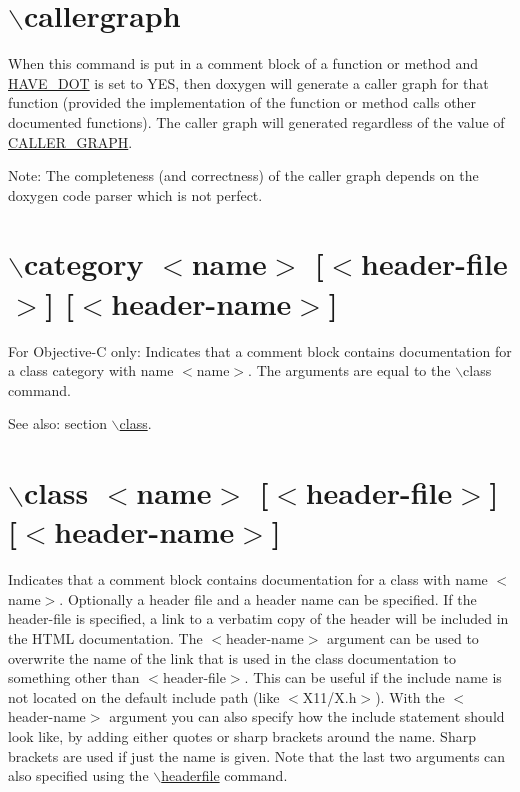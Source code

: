  \hypertarget{commands_cmdcallergraph}{}\section{$\backslash$callergraph}\label{commands_cmdcallergraph}
 When this command is put in a comment block of a function or method and \hyperlink{config_cfg_have_dot}{HAVE\_\-DOT} is set to YES, then doxygen will generate a caller graph for that function (provided the implementation of the function or method calls other documented functions). The caller graph will generated regardless of the value of \hyperlink{config_cfg_caller_graph}{CALLER\_\-GRAPH}. \begin{Desc}
\item[Note:]The completeness (and correctness) of the caller graph depends on the doxygen code parser which is not perfect.\end{Desc}


 \hypertarget{commands_cmdcategory}{}\section{$\backslash$category $<$name$>$ \mbox{[}$<$header-file$>$\mbox{]} \mbox{[}$<$header-name$>$\mbox{]}}\label{commands_cmdcategory}
 For Objective-C only: Indicates that a comment block contains documentation for a class category with name $<$name$>$. The arguments are equal to the $\backslash$class command.

\begin{Desc}
\item[See also:]section \hyperlink{commands_cmdclass}{$\backslash$class}.\end{Desc}


 \hypertarget{commands_cmdclass}{}\section{$\backslash$class $<$name$>$ \mbox{[}$<$header-file$>$\mbox{]} \mbox{[}$<$header-name$>$\mbox{]}}\label{commands_cmdclass}
 Indicates that a comment block contains documentation for a class with name $<$name$>$. Optionally a header file and a header name can be specified. If the header-file is specified, a link to a verbatim copy of the header will be included in the HTML documentation. The $<$header-name$>$ argument can be used to overwrite the name of the link that is used in the class documentation to something other than $<$header-file$>$. This can be useful if the include name is not located on the default include path (like $<$X11/X.h$>$). With the $<$header-name$>$ argument you can also specify how the include statement should look like, by adding either quotes or sharp brackets around the name. Sharp brackets are used if just the name is given. Note that the last two arguments can also specified using the \hyperlink{commands_cmdheaderfile}{$\backslash$headerfile} command.

